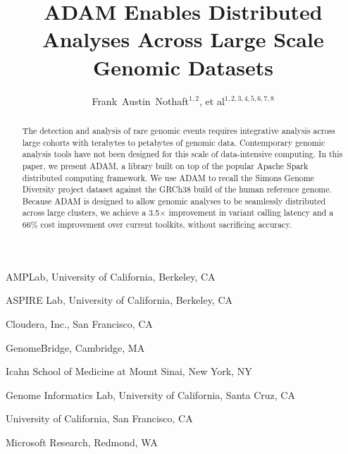 \documentclass{nature}
\title{ADAM Enables Distributed Analyses Across Large Scale Genomic Datasets}
\author{Frank~Austin~Nothaft$^{1, 2}$, et al$^{1, 2, 3, 4, 5, 6, 7, 8}$}
\begin{document}
\maketitle

\begin{affiliations}
\item AMPLab, University of California, Berkeley, CA
\item ASPIRE Lab, University of California, Berkeley, CA
\item Cloudera, Inc., San Francisco, CA
\item GenomeBridge, Cambridge, MA
\item Icahn School of Medicine at Mount Sinai, New York, NY
\item Genome Informatics Lab, University of California, Santa Cruz, CA
\item University of California, San Francisco, CA
\item Microsoft Research, Redmond, WA
\end{affiliations}

\begin{abstract}

The detection and analysis of rare genomic events requires integrative analysis
across large cohorts with terabytes to petabytes of genomic data. Contemporary
genomic analysis tools have not been designed for this scale of data-intensive
computing. In this paper, we present ADAM, a library built on top of the popular
Apache Spark distributed computing framework. We use ADAM to recall the Simons
Genome Diversity project dataset against the GRCh38 build of the human reference
genome. Because ADAM is designed to allow genomic analyses to be seamlessly
distributed across large clusters, we achieve a 3.5$\times$ improvement in variant
calling latency and a 66\% cost improvement over current toolkits, without
sacrificing accuracy.
\end{abstract}
\end{document}

